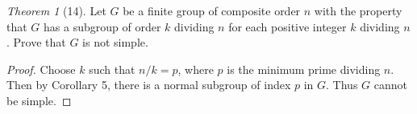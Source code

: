 \documentclass[12pt]{article}
\theoremstyle{remark}
\theoremstyle{named}
\newtheorem*{theorem}{Theorem}
\begin{document}
\begin{theorem}[14]
    Let \(G\) be a finite group of composite order \(n\) with the property that \(G\) has a subgroup of order \(k\) dividing \(n\) for each positive integer \(k\) dividing \(n\). Prove that \(G\) is not simple.
\end{theorem}

\begin{proof}
    Choose \(k\) such that \(n / k = p\), where \(p\) is the minimum prime dividing \(n\). Then by Corollary 5, there is a normal subgroup of index \(p\) in \(G\). Thus \(G\) cannot be simple.
\end{proof}
\end{document}
